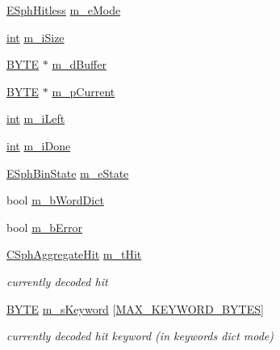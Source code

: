 \begin{DoxyCompactItemize}
\item 
\hyperlink{sphinx_8h_a1920852c5151009d65cf2bc8204a685b}{E\-Sph\-Hitless} \hyperlink{structCSphBin_a861ee78370a6e41c28521f7644b874f0}{m\-\_\-e\-Mode}
\item 
\hyperlink{sphinxexpr_8cpp_a4a26e8f9cb8b736e0c4cbf4d16de985e}{int} \hyperlink{structCSphBin_a320121da925a58ab1c97119100c37c9d}{m\-\_\-i\-Size}
\item 
\hyperlink{sphinxstd_8h_a4ae1dab0fb4b072a66584546209e7d58}{B\-Y\-T\-E} $\ast$ \hyperlink{structCSphBin_a06fb6c2e84ee5ba5089f71f079c23cf8}{m\-\_\-d\-Buffer}
\item 
\hyperlink{sphinxstd_8h_a4ae1dab0fb4b072a66584546209e7d58}{B\-Y\-T\-E} $\ast$ \hyperlink{structCSphBin_a2cbc4fc1ca50a07597654190a3209dcf}{m\-\_\-p\-Current}
\item 
\hyperlink{sphinxexpr_8cpp_a4a26e8f9cb8b736e0c4cbf4d16de985e}{int} \hyperlink{structCSphBin_aadb0f5bb65619974edc37480aadb571b}{m\-\_\-i\-Left}
\item 
\hyperlink{sphinxexpr_8cpp_a4a26e8f9cb8b736e0c4cbf4d16de985e}{int} \hyperlink{structCSphBin_aec500a6bd93797cf5b40fbfb262fb094}{m\-\_\-i\-Done}
\item 
\hyperlink{sphinx_8cpp_af6c4ab1ba3d444485726f59d66c706bb}{E\-Sph\-Bin\-State} \hyperlink{structCSphBin_a1d747189b986248a22e575f0da2fb61d}{m\-\_\-e\-State}
\item 
bool \hyperlink{structCSphBin_a30101558ae0ed600d3775cf605237610}{m\-\_\-b\-Word\-Dict}
\item 
bool \hyperlink{structCSphBin_a32c5fd379eadb75083b8fb585a54d549}{m\-\_\-b\-Error}
\item 
\hyperlink{structCSphAggregateHit}{C\-Sph\-Aggregate\-Hit} \hyperlink{structCSphBin_a94ae6f84db17c75dde3391de09696026}{m\-\_\-t\-Hit}
\begin{DoxyCompactList}\small\item\em currently decoded hit \end{DoxyCompactList}\item 
\hyperlink{sphinxstd_8h_a4ae1dab0fb4b072a66584546209e7d58}{B\-Y\-T\-E} \hyperlink{structCSphBin_a9751f2b14dfee0519796ddea19e2df28}{m\-\_\-s\-Keyword} \mbox{[}\hyperlink{sphinx_8cpp_aeb328d19a9780d5c5defcd7e9b08239b}{M\-A\-X\-\_\-\-K\-E\-Y\-W\-O\-R\-D\-\_\-\-B\-Y\-T\-E\-S}\mbox{]}
\begin{DoxyCompactList}\small\item\em currently decoded hit keyword (in keywords dict mode) \end{DoxyCompactList}\item 

\end{DoxyCompactItemize}
